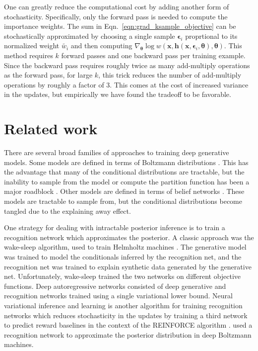\documentclass{article} %
\newcommand{\hid}{\mathbf{h}}
\newcommand{\params}{{\boldsymbol{\theta}}}
\newcommand{\obs}{\mathbf{x}}
\newcommand{\numSamples}{k}
\newcommand{\sampleIdx}{i}
\newcommand{\aux}{\boldsymbol{\epsilon}}
\newcommand{\auxS}[1]{\aux_{#1}}
\newcommand{\isWeight}{w}
\newcommand{\isWeightNormS}[1]{\widetilde{w_{#1}}}
\begin{document}
One can greatly reduce the computational cost by adding another form of stochasticity. Specifically, only the forward pass is needed to compute the importance weights. The sum in Eqn.~\ref{eqn:grad_ksample_objective} can be stochastically approximated by choosing a single sample $\auxS{\sampleIdx}$ proprtional to its normalized weight $\isWeightNormS{\sampleIdx}$ and then computing $\nabla_\params \log \isWeight(\obs, \hid(\obs, \auxS{\sampleIdx}, \params), \params)$. This method requires $\numSamples$ forward passes and one backward pass per training example. Since the backward pass requires roughly twice as many add-multiply operations as the forward pass, for large $\numSamples$, this trick reduces the number of add-multiply operations by roughly a factor of 3. This comes at the cost of increased variance in the updates, but empirically we have found the tradeoff to be favorable.



\section{Related work}
\label{sec:related-work}

There are several broad families of approaches to training deep generative models. Some models are defined in terms of Boltzmann distributions \citep{rbm,dbm}. This has the advantage that many of the conditional distributions are tractable, but the inability to sample from the model or compute the partition function has been a major roadblock \citep{ais-rbm}. Other models are defined in terms of belief networks \citep{deep-sigmoid,DARN}. These models are tractable to sample from, but the conditional distributions become tangled due to the explaining away effect. 

One strategy for dealing with intractable posterior inference is to train a recognition network which approximates the posterior. A classic approach was the wake-sleep algorithm, used to train Helmholtz machines \citep{helmholtz_machine}. The generative model was trained to model the conditionals inferred by the recognition net, and the recognition net was trained to explain synthetic data generated by the generative net. Unfortunately, wake-sleep trained the two networks on different objective functions. Deep autoregressive networks \citep{DARN} consisted of deep generative and recognition networks trained using a single variational lower bound. Neural variational inference and learning \citep{nvil} is another algorithm for training recognition networks which reduces stochasticity in the updates by training a third network to predict reward baselines in the context of the REINFORCE algorithm \citep{reinforce}. \citet{dbm-recognition} used a recognition network to approximate the posterior distribution in deep Boltzmann machines.
\end{document}
